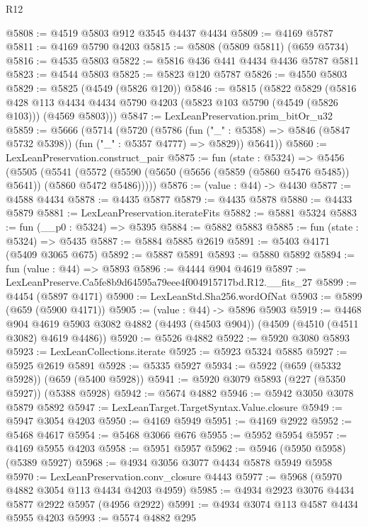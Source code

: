 \begin{lexlean}{R12}
\begin{coremodule}
@5808 := @4519 @5803 @912 @3545 @4437 @4434
@5809 := @4169 @5787
@5811 := @4169 @5790 @4203
@5815 := @5808 (@5809 @5811) (@659 @5734)
@5816 := @4535 @5803
@5822 := @5816 @436 @441 @4434 @4436 @5787 @5811
@5823 := @4544 @5803
@5825 := @5823 @120 @5787
@5826 := @4550 @5803
@5829 := @5825 (@4549 (@5826 @120))
@5846 := @5815
    (@5822
      @5829
      (@5816
        @428
        @113
        @4434
        @4434
        @5790
        @4203
        (@5823 @103 @5790 (@4549 (@5826 @103)))
        (@4569 @5803)))
@5847 := LexLeanPreservation.prim_bitOr_u32
@5859 := @5666
    (@5714
      (@5720
        (@5786 (fun ("_" : @5358) => @5846 (@5847 @5732 @5398)) (fun ("_" : @5357 @4777) => @5829))
        @5641))
@5860 := LexLeanPreservation.construct_pair
@5875 := fun (state : @5324) =>
  @5456
    (@5505
      (@5541 (@5572 (@5590 (@5650 (@5656 (@5859 (@5860 @5476 @5485)) @5641)) (@5860 @5472 @5486)))))
@5876 := (value : @44) -> @4430
@5877 := @4588 @4434
@5878 := @4435 @5877
@5879 := @4435 @5878
@5880 := @4433 @5879
@5881 := LexLeanPreservation.iterateFits
@5882 := @5881 @5324
@5883 := fun (__p0 : @5324) => @5395
@5884 := @5882 @5883
@5885 := fun (state : @5324) => @5435
@5887 := @5884 @5885 @2619
@5891 := @5403 @4171 (@5409 @3065 @675)
@5892 := @5887 @5891
@5893 := @5880 @5892
@5894 := fun (value : @44) => @5893
@5896 := @4444 @904 @4619
@5897 := LexLeanPreserve.Ca5fe8b9d64595a79eee4f004915717bd.R12.__fits_27
@5899 := @4454 (@5897 @4171)
@5900 := LexLeanStd.Sha256.wordOfNat
@5903 := @5899 (@659 (@5900 @4171))
@5905 := (value : @44) -> @5896 @5903
@5919 := @4468
    @904
    @4619
    @5903
    @3082
    @4882
    (@4493 (@4503 @904))
    (@4509 (@4510 (@4511 @3082) @4619 @4486))
@5920 := @5526 @4882
@5922 := @5920 @3080 @5893
@5923 := LexLeanCollections.iterate
@5925 := @5923 @5324 @5885
@5927 := @5925 @2619 @5891
@5928 := @5335 @5927
@5934 := @5922 (@659 (@5332 @5928)) (@659 (@5400 @5928))
@5941 := @5920 @3079 @5893 (@227 (@5350 @5927)) (@5388 @5928)
@5942 := @5674 @4882
@5946 := @5942 @3050 @3078 @5879 @5892
@5947 := LexLeanTarget.TargetSyntax.Value.closure
@5949 := @5947 @3054 @4203
@5950 := @4169 @5949
@5951 := @4169 @2922
@5952 := @5468 @4617
@5954 := @5468 @3066 @676
@5955 := @5952 @5954
@5957 := @4169 @5955 @4203
@5958 := @5951 @5957
@5962 := @5946 (@5950 @5958) (@5389 @5927)
@5968 := @4934 @3056 @3077 @4434 @5878 @5949 @5958
@5970 := LexLeanPreservation.conv_closure @4443
@5977 := @5968 (@5970 @4882 @3054 @113 @4434 @4203 @4959)
@5985 := @4934 @2923 @3076 @4434 @5877 @2922 @5957 (@4956 @2922)
@5991 := @4934 @3074 @113 @4587 @4434 @5955 @4203
@5993 := @5574 @4882 @295

\end{coremodule}
\end{lexlean}
